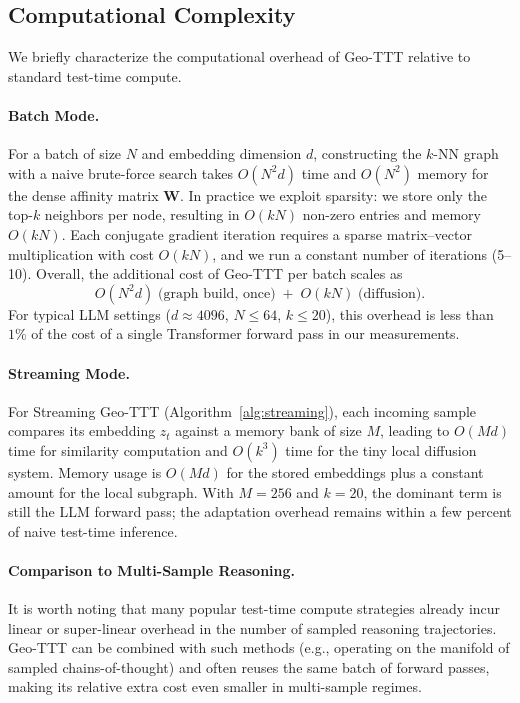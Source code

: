 \documentclass{article}
\theoremstyle{plain}
\theoremstyle{definition}
\theoremstyle{remark}
\newcommand{\W}{\mathbf{W}}        %
\begin{document}
\subsection{Computational Complexity}
\label{sec:complexity}

We briefly characterize the computational overhead of Geo-TTT relative to standard test-time compute.

\paragraph{Batch Mode.}
For a batch of size $N$ and embedding dimension $d$, constructing the $k$-NN graph with a naive brute-force search takes $O(N^2 d)$ time and $O(N^2)$ memory for the dense affinity matrix $\W$. In practice we exploit sparsity: we store only the top-$k$ neighbors per node, resulting in $O(kN)$ non-zero entries and memory $O(kN)$. Each conjugate gradient iteration requires a sparse matrix--vector multiplication with cost $O(kN)$, and we run a constant number of iterations (5--10). Overall, the additional cost of Geo-TTT per batch scales as
\[
O(N^2 d) \;\text{(graph build, once)} \;+\; O(kN) \;\text{(diffusion)}.
\]
For typical LLM settings ($d \approx 4096$, $N \le 64$, $k \le 20$), this overhead is less than $1\%$ of the cost of a single Transformer forward pass in our measurements.

\paragraph{Streaming Mode.}
For Streaming Geo-TTT (Algorithm~\ref{alg:streaming}), each incoming sample compares its embedding $z_t$ against a memory bank of size $M$, leading to $O(Md)$ time for similarity computation and $O(k^3)$ time for the tiny local diffusion system. Memory usage is $O(Md)$ for the stored embeddings plus a constant amount for the local subgraph. With $M=256$ and $k=20$, the dominant term is still the LLM forward pass; the adaptation overhead remains within a few percent of naive test-time inference.

\paragraph{Comparison to Multi-Sample Reasoning.}
It is worth noting that many popular test-time compute strategies \cite{selfconsistency2022, lightman2024let, snell2024scaling} already incur linear or super-linear overhead in the number of sampled reasoning trajectories. Geo-TTT can be combined with such methods (e.g., operating on the manifold of sampled chains-of-thought) and often reuses the same batch of forward passes, making its relative extra cost even smaller in multi-sample regimes.
\end{document}
